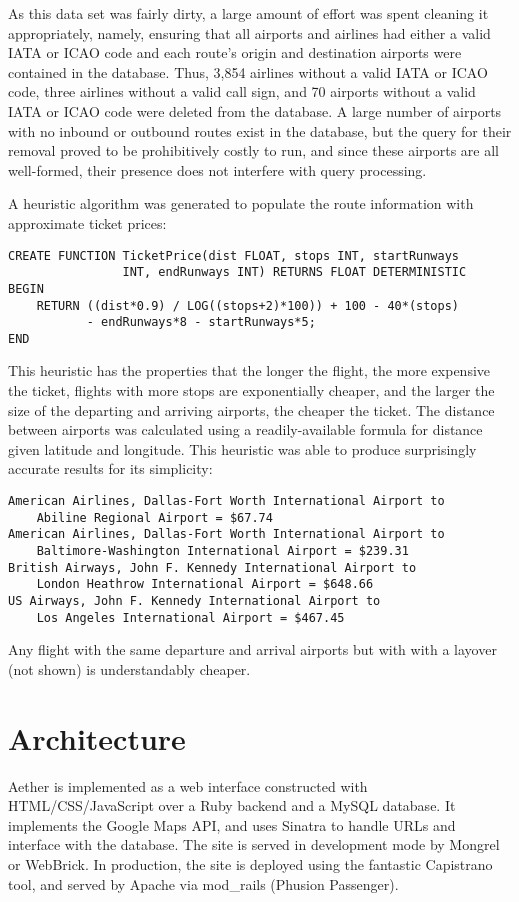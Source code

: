 \indent As this data set was fairly dirty, a large amount of effort was spent cleaning it appropriately, namely, ensuring that all airports and airlines had either a valid IATA or ICAO code and each route's origin and destination airports were contained in the database. Thus, 3,854 airlines without a valid IATA or ICAO code, three airlines without a valid call sign, and 70 airports without a valid IATA or ICAO code were deleted from the database. A large number of airports with no inbound or outbound routes exist in the database, but the query for their removal proved to be prohibitively costly to run, and since these airports are all well-formed, their presence does not interfere with query processing.
	
\indent A heuristic algorithm was generated to populate the route information with approximate ticket prices: 
\begin{verbatim}
CREATE FUNCTION TicketPrice(dist FLOAT, stops INT, startRunways
                INT, endRunways INT) RETURNS FLOAT DETERMINISTIC
BEGIN
    RETURN ((dist*0.9) / LOG((stops+2)*100)) + 100 - 40*(stops)
           - endRunways*8 - startRunways*5;
END
\end{verbatim}
This heuristic has the properties that the longer the flight, the more expensive the ticket, flights with more stops are exponentially cheaper, and the larger the size of the departing and arriving airports, the cheaper the ticket. The distance between airports was calculated using a readily-available formula for distance given latitude and longitude. This heuristic was able to produce surprisingly accurate results for its simplicity:
\begin{verbatim}
American Airlines, Dallas-Fort Worth International Airport to
    Abiline Regional Airport = $67.74 
American Airlines, Dallas-Fort Worth International Airport to
    Baltimore-Washington International Airport = $239.31
British Airways, John F. Kennedy International Airport to
    London Heathrow International Airport = $648.66
US Airways, John F. Kennedy International Airport to 
    Los Angeles International Airport = $467.45
\end{verbatim}
Any flight with the same departure and arrival airports but with with a layover (not shown) is understandably cheaper.

\section{Architecture}
Aether is implemented as a web interface constructed with HTML/CSS/JavaScript over a Ruby backend and a MySQL database. It implements the Google Maps API, and uses Sinatra to handle URLs and interface with the database. The site is served in development mode by Mongrel or WebBrick. In production, the site is deployed using the fantastic Capistrano tool, and served by Apache via mod\_rails (Phusion Passenger).

